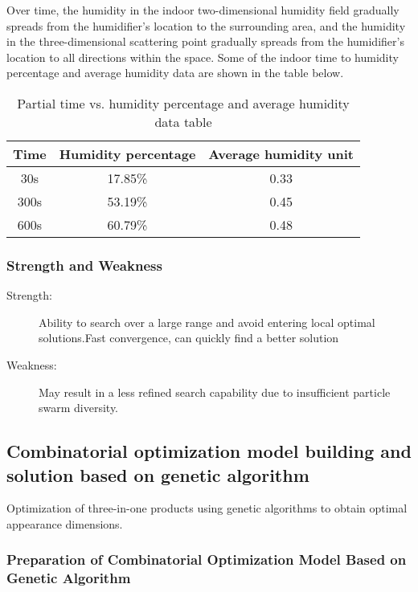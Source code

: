 \documentclass{apmcmthesis}
\begin{document}
Over time, the humidity in the indoor two-dimensional humidity field gradually spreads from the humidifier's location to the surrounding area, and the humidity in the three-dimensional scattering point gradually spreads from the humidifier's location to all directions within the space. Some of the indoor time to humidity percentage and average humidity data are shown in the table below.

\begin{table}
	\centering
	\caption{Partial time vs. humidity percentage and average humidity data table} %
	\label{tab:partial_time_vs_humidity} %
	\begin{tabular}{ccc} 
		\hline
		Time & Humidity percentage & Average humidity unit \\ 
		\hline
		30s  & 17.85\%             & 0.33                  \\
		300s & 53.19\%             & 0.45                  \\
		600s & 60.79\%             & 0.48                  \\
		\hline
	\end{tabular}
\end{table}

\subsubsection{Strength and Weakness}

\begin{description}
	\item[Strength:]Ability to search over a large range and avoid entering local optimal solutions.Fast convergence, can quickly find a better solution
	\item[Weakness:]  May result in a less refined search capability due to insufficient particle swarm diversity.
\end{description}
\subsection{Combinatorial optimization model building and solution based on genetic algorithm}
Optimization of three-in-one products using genetic algorithms to obtain optimal appearance dimensions.

\subsubsection{Preparation of Combinatorial Optimization Model Based on Genetic Algorithm}
\end{document}
